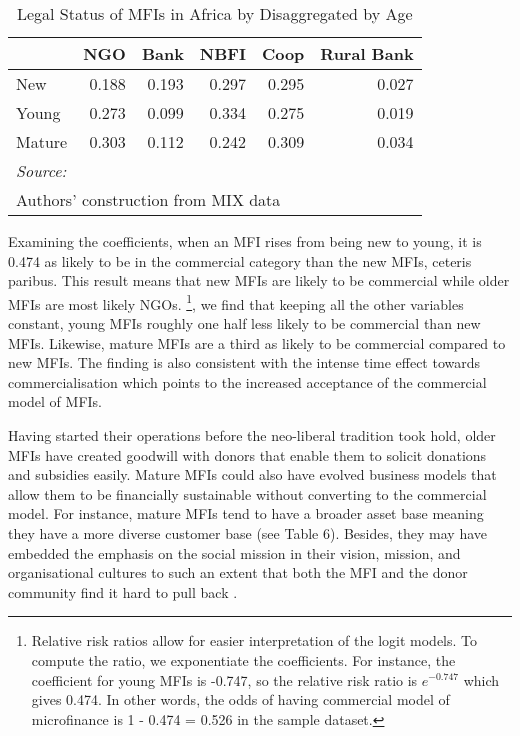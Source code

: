 \documentclass[a4paper,nobind]{templates/ociamthesis}
\begin{document}
\begin{table}

\caption{\label{tab:unnamed-chunk-19}Legal Status of MFIs in Africa by Disaggregated by Age}
\centering
\begin{tabular}[t]{lrrrrr}
\toprule
  & NGO & Bank & NBFI & Coop & Rural Bank\\
\midrule
New & 0.188 & 0.193 & 0.297 & 0.295 & 0.027\\
Young & 0.273 & 0.099 & 0.334 & 0.275 & 0.019\\
Mature & 0.303 & 0.112 & 0.242 & 0.309 & 0.034\\
\bottomrule
\multicolumn{6}{l}{\rule{0pt}{1em}\textit{Source: }}\\
\multicolumn{6}{l}{\rule{0pt}{1em}Authors' construction from MIX data}\\
\end{tabular}
\end{table}

Examining the coefficients, when an MFI rises from being new to young, it is 0.474 as likely to be in the commercial category than the new MFIs, ceteris paribus. This result means that new MFIs are likely to be commercial while older MFIs are most likely NGOs. \footnote{Relative risk ratios allow for easier interpretation of the logit models. To compute the ratio, we exponentiate the coefficients. For instance, the coefficient for young MFIs is -0.747, so the relative risk ratio is \(e^{-0.747}\) which gives 0.474. In other words, the odds of having commercial model of microfinance is 1 - 0.474 = 0.526 in the sample dataset.}, we find that keeping all the other variables constant, young MFIs roughly one half less likely to be commercial than new MFIs. Likewise, mature MFIs are a third as likely to be commercial compared to new MFIs. The finding is also consistent with the intense time effect towards commercialisation which points to the increased acceptance of the commercial model of MFIs.

Having started their operations before the neo-liberal tradition took hold, older MFIs have created goodwill with donors that enable them to solicit donations and subsidies easily. Mature MFIs could also have evolved business models that allow them to be financially sustainable without converting to the commercial model. For instance, mature MFIs tend to have a broader asset base meaning they have a more diverse customer base (see Table 6). Besides, they may have embedded the emphasis on the social mission in their vision, mission, and organisational cultures to such an extent that both the MFI and the donor community find it hard to pull back \autocite{ramus2017,berbegal2019impact}.
\end{document}
